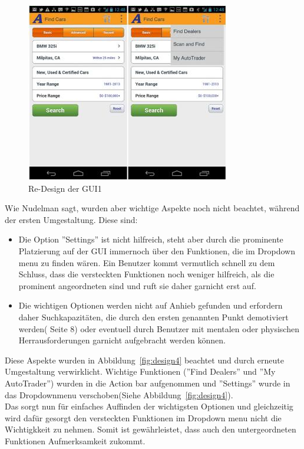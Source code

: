 \begin{figure}[h]
 \centering
 \includegraphics[height=0.40\textheight]{img/Design3.png}
 \caption{Re-Design der GUI1}
 \label{fig:design3}
\end{figure}

Wie Nudelman sagt, wurden aber wichtige Aspekte noch nicht beachtet, während der ersten Umgestaltung. Diese sind:
\begin{itemize}
\item Die Option ''Settings'' ist nicht hilfreich, steht aber durch die prominente Platzierung auf der GUI immernoch über den Funktionen, die im Dropdown menu zu finden wären. Ein Benutzer kommt vermutlich schnell zu dem Schluss, dass die versteckten Funktionen noch weniger hilfreich, als die prominent angeordneten sind und ruft sie daher garnicht erst auf.\\
\item Die wichtigen Optionen werden nicht auf Anhieb gefunden und erfordern daher Suchkapazitäten, die durch den ersten genannten Punkt demotiviert werden(\cite{AndroidDesignPatterns} Seite 8) oder eventuell durch Benutzer mit mentalen oder physischen Herrausforderungen garnicht aufgebracht werden können.\\
\end{itemize}

Diese Aspekte wurden in Abbildung~\ref{fig:design4} beachtet und durch erneute Umgestaltung verwirklicht. Wichtige Funktionen (''Find Dealers'' und ''My AutoTrader'') wurden in die Action bar aufgenommen und ''Settings'' wurde in das Dropdownmenu verschoben(Siehe Abbildung~\ref{fig:design4}).\\

Das sorgt nun für einfaches Auffinden der wichtigsten Optionen und gleichzeitig wird dafür gesorgt den versteckten Funktionen im Dropdown menu nicht die Wichtigkkeit zu nehmen. Somit ist gewährleistet, dass auch den untergeordneten Funktionen Aufmerksamkeit zukommt.\\

